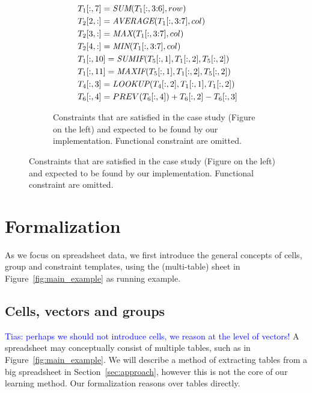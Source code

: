 \documentclass{sig-alternate-05-2015}
\newcommand{\tias}[1]{\textcolor{blue}{{\sc Tias:} #1}\xspace}
\newcommand{\range}[3]{\ensuremath{#1[#2,#3]}}
\newcommand{\rangeto}[2]{#1{:}#2}
\newcommand{\rangeall}{:}
\newcommand{\eccalc}[2]{\ensuremath{#1 = #2}}
\newcommand{\eclookupf}[4]{\ensuremath{\textit{LOOKUP}_{\textit{#4}}(#1, #2, #3)}}
\newcommand{\eclookup}[4]{\eccalc{#1}{\eclookupf{#2}{#3}{#4}{}}}
\newcommand{\ecaggc}[3]{\eccalc{#2}{\textit{#1}(#3, col)}}
\newcommand{\ecsumr}[2]{\eccalc{#1}{\textit{SUM}(#2, row)}}
\newcommand{\ecaggif}[5]{\eccalc{#2}{\textit{#1IF}(#3, #4, #5)}}
\begin{document}
\begin{figure}[thb]
\begin{subfigure}{.30\textwidth}
{\begin{align*}
%
      &~\ecsumr{\range{T_{1}}{\rangeall}{7}}{\range{T_{1}}{\rangeall}{\rangeto{3}{6}}} \\
%
      &~\ecaggc{\textit{AVERAGE}}{\range{T_{2}}{2}{\rangeall}}{\range{T_{1}}{\rangeall}{\rangeto{3}{7}}} \\
%
      &~\ecaggc{\textit{MAX}}{\range{T_{2}}{3}{\rangeall}}{\range{T_{1}}{\rangeall}{\rangeto{3}{7}}} \\
%
      &~\ecaggc{\textit{MIN}}{\range{T_{2}}{4}{\rangeall}}{\range{T_{1}}{\rangeall}{\rangeto{3}{7}}} \\
%
      &~\ecaggif{\textit{SUM}}{\range{T_{1}}{\rangeall}{10}}{\range{T_{5}}{\rangeall}{1}}{\range{T_{1}}{\rangeall}{2}}{\range{T_{5}}{\rangeall}{2}} \\
%
      &~\ecaggif{\textit{MAX}}{\range{T_{1}}{\rangeall}{11}}{\range{T_{5}}{\rangeall}{1}}{\range{T_{1}}{\rangeall}{2}}{\range{T_{5}}{\rangeall}{2}} \\
%
      &~\eclookup{\range{T_{4}}{\rangeall}{3}}{\range{T_{4}}{\rangeall}{2}}{\range{T_{1}}{\rangeall}{1}}{\range{T_{1}}{\rangeall}{2}} \\
%
      &~\range{T_{6}}{\rangeall}{4} = PREV(\range{T_{6}}{\rangeall}{4}) + \range{T_{6}}{\rangeall}{2} - \range{T_{6}}{\rangeall}{3}
    \end{align*}}
  \vspace{-10pt}
  \caption{Constraints that are satisfied in the case study (Figure on the left) and expected to be found by our implementation. Functional constraint are omitted.}
  \label{fig:sol_example}
\end{subfigure}
\end{figure}


\section{Formalization}\label{sec:formalization}
As we focus on spreadsheet data, we first introduce the general concepts of cells, group and constraint templates, using the (multi-table) sheet in Figure~\ref{fig:main_example} as running example.

\subsection{Cells, vectors and groups}
\tias{perhaps we should not introduce cells, we reason at the level of vectors!}
A spreadsheet may conceptually consist of multiple tables, such as in Figure~\ref{fig:main_example}. We will describe a method of extracting tables from a big spreadsheet in Section~\ref{sec:approach}, however this is not the core of our learning method. Our formalization reasons over tables directly.
\end{document}

